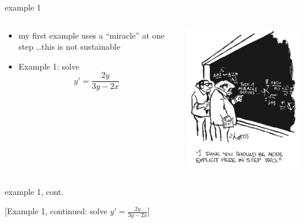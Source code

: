 \documentclass{beamer}
\begin{document}
\begin{frame}{example 1}

\begin{columns}
\begin{column}{0.65\textwidth}
\begin{itemize}
\item my first example uses a ``miracle'' at one step \dots this is not sustainable
\item Example 1: solve
    $$y' = \frac{2y}{3y-2x}$$

\vspace{40mm}
\end{itemize}
\end{column}
\begin{column}{0.35\textwidth}
\includegraphics[width=\textwidth]{figs/miracle}

\vspace{20mm}
\end{column}
\end{columns}
\end{frame}


\begin{frame}{example 1, cont.}

[Example 1, continued: solve $y' = \frac{2y}{3y-2x}$]

\vspace{60mm}
\end{frame}
\end{document}
